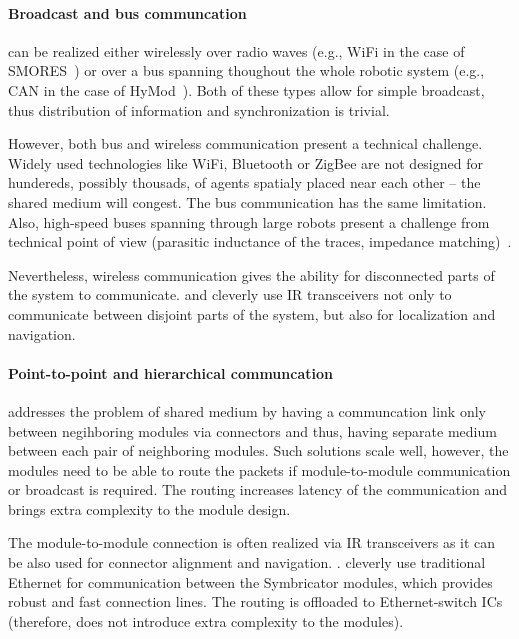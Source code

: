 \paragraph{Broadcast and bus communcation} can be realized either
wirelessly over radio waves (e.g., WiFi in the case of
SMORES~\cite{DBLP:conf/iros/DaveyKY12}) or over a bus spanning thoughout the
whole robotic system (e.g., CAN in the case of
HyMod~\cite{DBLP:conf/dars/ParrottDG16}). Both of these types allow for simple
broadcast, thus distribution of information and synchronization is trivial.

However, both bus and wireless communication present a technical challenge.
Widely used technologies like WiFi, Bluetooth or ZigBee are not designed for
hundereds, possibly thousads, of agents spatialy placed near each other -- the
shared medium will congest. The bus communication has the same limitation. Also,
high-speed buses spanning through large robots present a challenge from
technical point of view (parasitic inductance of the traces, impedance
matching)~\cite{DBLP:conf/dars/ParrottDG16}.

Nevertheless, wireless communication gives the ability for disconnected parts of
the system to communicate. \textcite{DBLP:conf/iros/YimSSPDT07a} and
\textcite{DBLP:journals/corr/abs-1109-2288} cleverly use IR transceivers not
only to communicate between disjoint parts of the system, but also for
localization and navigation.

\paragraph{Point-to-point and hierarchical communcation} addresses the problem
of shared medium by having a communcation link only between negihboring modules
via connectors and thus, having separate medium between each pair of neighboring
modules. Such solutions scale well, however, the modules need to be able to
route the packets if module-to-module communication or broadcast is required.
The routing increases latency of the communication and brings extra complexity
to the module design.

The module-to-module connection is often realized via IR transceivers as it can
be also used for connector alignment and navigation.
\cite{DBLP:conf/iros/YimSSPDT07a}. \textcite{DBLP:journals/corr/abs-1109-2288}
cleverly use traditional Ethernet for communication between the Symbricator
modules, which provides robust and fast connection lines. The routing is
offloaded to Ethernet-switch ICs (therefore, does not introduce extra complexity
to the modules).


